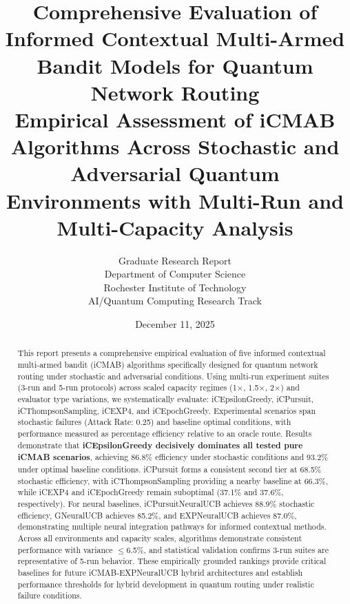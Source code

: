 \documentclass[12pt,a4paper]{article}
\title{\textbf{Comprehensive Evaluation of Informed Contextual Multi-Armed Bandit Models for Quantum Network Routing}\\
\large{Empirical Assessment of iCMAB Algorithms Across Stochastic and Adversarial Quantum Environments with Multi-Run and Multi-Capacity Analysis}}
\author{Graduate Research Report\\
Department of Computer Science\\
Rochester Institute of Technology\\
AI/Quantum Computing Research Track}
\date{December 11, 2025}
\newcommand{\primarytext}[1]{\textcolor{primaryblue}{\textbf{#1}}}
\begin{document}
\maketitle

\begin{abstract}
This report presents a comprehensive empirical evaluation of five informed contextual multi-armed bandit (iCMAB) algorithms specifically designed for quantum network routing under stochastic and adversarial conditions. Using multi-run experiment suites (3-run and 5-run protocols) across scaled capacity regimes (1$\times$, 1.5$\times$, 2$\times$) and evaluator type variations, we systematically evaluate: iCEpsilonGreedy, iCPursuit, iCThompsonSampling, iCEXP4, and iCEpochGreedy. Experimental scenarios span stochastic failures (Attack Rate: 0.25) and baseline optimal conditions, with performance measured as percentage efficiency relative to an oracle route. Results demonstrate that \primarytext{iCEpsilonGreedy decisively dominates all tested pure iCMAB scenarios}, achieving 86.8\% efficiency under stochastic conditions and 93.2\% under optimal baseline conditions. iCPursuit forms a consistent second tier at 68.5\% stochastic efficiency, with iCThompsonSampling providing a nearby baseline at 66.3\%, while iCEXP4 and iCEpochGreedy remain suboptimal (37.1\% and 37.6\%, respectively). For neural baselines, iCPursuitNeuralUCB achieves 88.9\% stochastic efficiency, GNeuralUCB achieves 85.2\%, and EXPNeuralUCB achieves 87.0\%, demonstrating multiple neural integration pathways for informed contextual methods. Across all environments and capacity scales, algorithms demonstrate consistent performance with variance $\leq$6.5\%, and statistical validation confirms 3-run suites are representative of 5-run behavior. These empirically grounded rankings provide critical baselines for future iCMAB-EXPNeuralUCB hybrid architectures and establish performance thresholds for hybrid development in quantum routing under realistic failure conditions.
\end{abstract}

\newpage
\tableofcontents

\newpage
\end{document}
